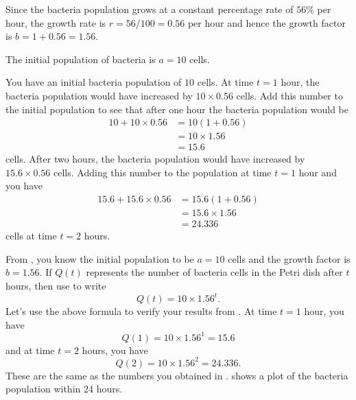 \documentclass[a4paper,oneside,12pt]{article}
\begin{document}
\begin{solution}
Since the bacteria population grows at a constant percentage rate of
$56\%$ per hour, the growth rate is $r = 56 / 100 = 0.56$ per hour and
hence the growth factor is $b = 1 + 0.56 = 1.56$.

The initial population of bacteria is $a = 10$ cells.

You have an initial bacteria population of $10$ cells.  At time
$t = 1$ hour, the bacteria population would have increased by
$10 \times 0.56$ cells.  Add this number to the initial population to
see that after one hour the bacteria population would be
\begin{align*}
10 + 10 \times 0.56
&=
10 (1 + 0.56) \\[4pt]
&=
10 \times 1.56 \\[4pt]
&=
15.6
\end{align*}
cells.  After two hours, the bacteria population would have increased
by $15.6 \times 0.56$ cells.  Adding this number to the population at
time $t = 1$ hour and you have
\begin{align*}
15.6 + 15.6 \times 0.56
&=
15.6 (1 + 0.56) \\[4pt]
&=
15.6 \times 1.56 \\[4pt]
&=
24.336
\end{align*}
cells at time $t = 2$ hours.

From ,
you know the initial population to be $a = 10$ cells and the growth
factor is $b = 1.56$.  If $Q(t)$ represents the number of bacteria
cells in the Petri dish after $t$ hours, then use
 to write
\begin{equation}
\label{eqn:bacterial_growth}
Q(t)
=
10 \times 1.56^t.
\end{equation}
Let's use the above formula to verify your results
from .  At time $t = 1$ hour,
you have
\[
Q(1)
=
10 \times 1.56^1
=
15.6
\]
and at time $t = 2$ hours, you have
\[
Q(2)
=
10 \times 1.56^2
=
24.336.
\]
These are the same as the numbers you obtained
in .
 shows a plot of the bacteria
population within $24$ hours.
\end{solution}
\end{document}
